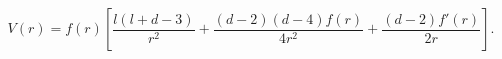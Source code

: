 \begin{equation} \label{potential-hs}
V(r) = f(r) \left[ \frac{l(l+d-3)}{r^2} + \frac{(d-2)(d-4)f(r)}{4r^2} + \frac{(d-2)f'(r)}{2r} \right].
\end{equation}

